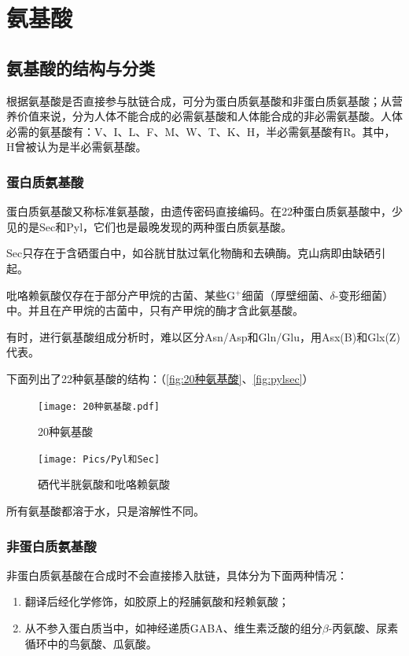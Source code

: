\section{氨基酸}
\subsection{氨基酸的结构与分类}

根据氨基酸是否直接参与肽链合成，可分为蛋白质氨基酸和非蛋白质氨基酸；从营养价值来说，分为人体不能合成的必需氨基酸和人体能合成的非必需氨基酸。人体必需的氨基酸有：V、I、L、F、M、W、T、K、H，半必需氨基酸有R。其中，H曾被认为是半必需氨基酸。

\subsubsection{蛋白质氨基酸}

蛋白质氨基酸又称标准氨基酸，由遗传密码直接编码。在22种蛋白质氨基酸中，少见的是Sec和Pyl，它们也是最晚发现的两种蛋白质氨基酸。

Sec只存在于含硒蛋白中，如谷胱甘肽过氧化物酶和去碘酶。克山病即由缺硒引起。

吡咯赖氨酸仅存在于部分产甲烷的古菌、某些G$^{+}$细菌（厚壁细菌、$\delta$-变形细菌）中。并且在产甲烷的古菌中，只有产甲烷的酶才含此氨基酸。

有时，进行氨基酸组成分析时，难以区分Asn/Asp和Gln/Glu，用Asx(B)和Glx(Z)代表。

下面列出了22种氨基酸的结构：（\autoref{fig:20种氨基酸}、\autoref{fig:pylsec}）

\begin{figure}[htbp]
	\centering
	\texttt{[image: 20种氨基酸.pdf]}
	\caption{20种氨基酸}
	\label{fig:20种氨基酸}
\end{figure}

\begin{figure}[htbp]
	\centering
	\texttt{[image: Pics/Pyl和Sec]}
	\caption{硒代半胱氨酸和吡咯赖氨酸}
	\label{fig:pylsec}
\end{figure}


所有氨基酸都溶于水，只是溶解性不同。

\subsubsection{非蛋白质氨基酸}

非蛋白质氨基酸在合成时不会直接掺入肽链，具体分为下面两种情况：
\begin{enumerate}
	\item 翻译后经化学修饰，如胶原上的羟脯氨酸和羟赖氨酸；
	\item 从不参入蛋白质当中，如神经递质GABA、维生素泛酸的组分$\beta$-丙氨酸、尿素循环中的鸟氨酸、瓜氨酸。
\end{enumerate}

